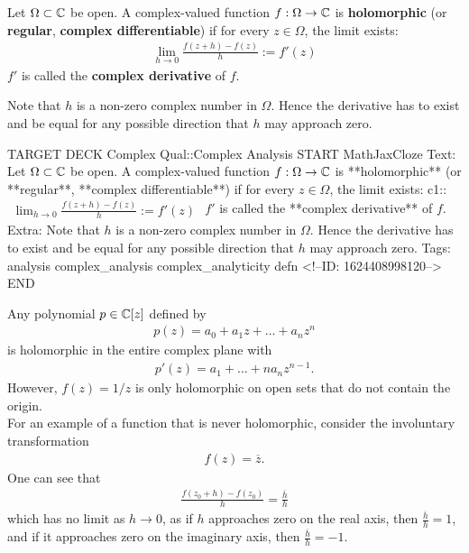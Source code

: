 \documentclass{memoir}
\begin{document}
\begin{defn}[Holomorphic] %
\label{defn:Holomorphic}
	Let \(\Omega\subset \mathbb{C}\) be open. A complex-valued function \(f:\Omega\to \mathbb{C}\) is \textbf{holomorphic} (or \textbf{regular}, \textbf{complex differentiable}) if for every \(z\in \Omega\), the limit exists:
	\begin{align*}
		\lim_{h \to 0} \frac{f(z+h)-f(z)}{h} := f'(z)
	\end{align*}
	\(f'\) is called the \textbf{complex derivative} of \(f\).
\end{defn}
Note that \(h\) is a non-zero complex number in \(\Omega\). Hence the derivative has to exist and be equal for any possible direction that \(h\) may approach zero.\\

\begin{anki}
TARGET DECK
Complex Qual::Complex Analysis
START
MathJaxCloze
Text: Let \(\Omega\subset \mathbb{C}\) be open. A complex-valued function \(f:\Omega\to \mathbb{C}\) is **holomorphic** (or **regular**, **complex differentiable**) if for every \(z\in \Omega\), the limit exists:
 {{c1::\(\begin{align*}
         	\lim_{h \to 0} \frac{f(z+h)-f(z)}{h} := f'(z)
         \end{align*}\)}} 
	\(f'\) is called the **complex derivative** of \(f\).
Extra: Note that \(h\) is a non-zero complex number in \(\Omega\). Hence the derivative has to exist and be equal for any possible direction that \(h\) may approach zero.
Tags: analysis complex_analysis complex_analyticity defn
<!--ID: 1624408998120-->
END
\end{anki}

\begin{exmp}
	Any polynomial \(p \in \mathbb{C}[z]\) defined by
	\begin{align*}
		p(z) = a_0 + a_1z + \ldots + a_n z^{n}
	\end{align*}
	is holomorphic in the entire complex plane with
	\begin{align*}
		p'(z) = a_1 + \ldots + na_n z^{n-1}.
	\end{align*}
	However, \(f(z) = 1 / z\) is only holomorphic on open sets that do not contain the origin.\\

	For an example of a function that is never holomorphic, consider the involuntary transformation
	\begin{align*}
		f(z) = \overline{z}.
	\end{align*}
	One can see that
	\begin{align*}
		\frac{f(z_0+h) - f(z_0)}{h} = \frac{\overline{h}}{h}
	\end{align*}
	which has no limit as \(h\to 0\), as if \(h\) approaches zero on the real axis, then \(\frac{\overline{h}}{h} = 1\), and if it approaches zero on the imaginary axis, then \(\frac{\overline{h}}{h}= -1\).
\end{exmp}
\end{document}
